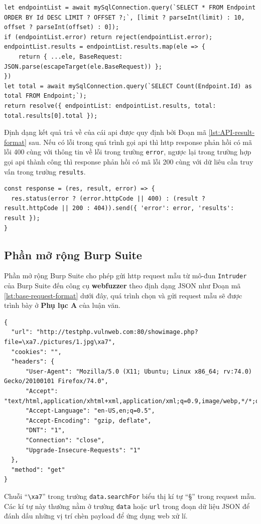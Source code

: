 \begin{lstlisting}[style=ES6, label={lst:sql-query-with-paging}, caption={\acrshort{api} truy vấn danh sách request mẫu có hỗ trợ phân trang}]
let endpointList = await mySqlConnection.query(`SELECT * FROM Endpoint ORDER BY Id DESC LIMIT ? OFFSET ?;`, [limit ? parseInt(limit) : 10, offset ? parseInt(offset) : 0]);
if (endpointList.error) return reject(endpointList.error);
endpointList.results = endpointList.results.map(ele => {
    return { ...ele, BaseRequest: JSON.parse(escapeTarget(ele.BaseRequest)) };
})
let total = await mySqlConnection.query(`SELECT Count(Endpoint.Id) as total FROM Endpoint;`);
return resolve({ endpointList: endpointList.results, total: total.results[0].total });
\end{lstlisting}
Định dạng kết quả trả về của cái \acrshort{api} được quy định bởi Đoạn mã \ref{lst:API-result-format} sau. Nếu có lỗi trong quá trình gọi \acrshort{api} thì \acrshort{http} response phản hồi có mã lỗi 400 cùng với thông tin về lỗi trong trường \texttt{error}, ngược lại trong trường hợp gọi \acrshort{api} thành công thì response phản hồi có mã lỗi 200 cùng với dữ liêu cần truy vấn trong trường \texttt{results}.
\begin{lstlisting}[style=ES6, label={lst:API-result-format}, caption={Định dạng kết quả API trả về ở backend}]
const response = (res, result, error) => {
  res.status(error ? (error.httpCode || 400) : (result ? result.httpCode || 200 : 404)).send({ 'error': error, 'results': result });
}
\end{lstlisting}
\subsection{Phần mở rộng Burp Suite}
Phần mở rộng Burp Suite cho phép gửi \acrshort{http} request mẫu từ mô-đun \texttt{Intruder} của Burp Suite đến công cụ \textbf{webfuzzer} theo định dạng JSON như Đoạn mã \ref{lst:base-request-format} dưới đây, quá trình chọn và gửi request mẫu sẽ được trình bày ở \textbf{Phụ lục A} của luận văn.
\begin{lstlisting}[style=ES6, label={lst:base-request-format}, caption={Cấu trúc của một HTTP request mẫu được gửi từ phần mở rộng Burp Suite}]
{
  "url": "http://testphp.vulnweb.com:80/showimage.php?file=\xa7./pictures/1.jpg\xa7",
  "cookies": "",
  "headers": {
      "User-Agent": "Mozilla/5.0 (X11; Ubuntu; Linux x86_64; rv:74.0) Gecko/20100101 Firefox/74.0",
      "Accept": "text/html,application/xhtml+xml,application/xml;q=0.9,image/webp,*/*;q=0.8",
      "Accept-Language": "en-US,en;q=0.5",
      "Accept-Encoding": "gzip, deflate",
      "DNT": "1",
      "Connection": "close",
      "Upgrade-Insecure-Requests": "1"
  },
  "method": "get"
}
\end{lstlisting}
Chuỗi ``\texttt{\textbackslash xa7}'' trong trường \texttt{data.searchFor} biểu thị kí tự ``\S'' trong request mẫu. Các kí tự này thường nằm ở trường \texttt{data} hoặc \texttt{url} trong đoạn dữ liệu JSON để đánh dấu những vị trí chèn payload để ứng dụng web xử lí. 
